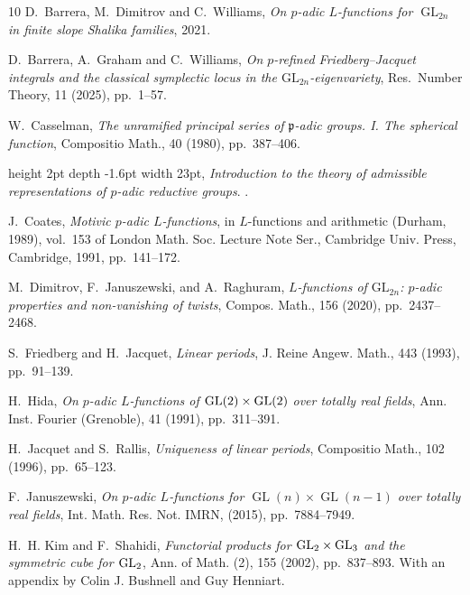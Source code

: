 \documentclass{amsart}
\theoremstyle{definition}
\begin{document}
{\begin{thebibliography}{10}
{\sc D.~Barrera, M.~Dimitrov and C.~Williams}, {\em On $p$-adic
  $L$-functions for $\operatorname{GL}_{2n}$ in finite slope Shalika families}, 2021.

{\sc D.~Barrera, A.~Graham and C.~Williams}, {\em On $p$-refined
  {F}riedberg--{J}acquet integrals and the classical symplectic locus in the
  {$\mathrm{GL}_{2n}$}-eigenvariety}, Res.\ Number Theory, 11 (2025),
  pp.~1--57.


{\sc W.~Casselman}, {\em The unramified principal series of
  {$\mathfrak{p}$}-adic groups. {I}. {T}he spherical function}, Compositio
  Math., 40 (1980), pp.~387--406.

\leavevmode\vrule height 2pt depth -1.6pt width 23pt, {\em Introduction to the
  theory of admissible representations of $p$-adic reductive groups}.
.

{\sc J.~Coates}, {\em Motivic {$p$}-adic {$L$}-functions}, in {$L$}-functions
  and arithmetic ({D}urham, 1989), vol.~153 of London Math. Soc. Lecture Note
  Ser., Cambridge Univ. Press, Cambridge, 1991, pp.~141--172.

{\sc M.~Dimitrov, F.~Januszewski, and A.~Raghuram}, {\em {$L$}-functions of
  {$\mathrm{GL}_{2n}$}: {$p$}-adic properties and non-vanishing of twists},
  Compos. Math., 156 (2020), pp.~2437--2468.

{\sc S.~Friedberg and H.~Jacquet}, {\em Linear periods}, J. Reine Angew. Math.,
  443 (1993), pp.~91--139.

{\sc H.~Hida}, {\em On {$p$}-adic {$L$}-functions of {${\rm GL}(2)\times {\rm
  GL}(2)$} over totally real fields}, Ann. Inst. Fourier (Grenoble), 41 (1991),
  pp.~311--391.

{\sc H.~Jacquet and S.~Rallis}, {\em Uniqueness of linear periods}, Compositio
  Math., 102 (1996), pp.~65--123.

{\sc F.~Januszewski}, {\em On {$p$}-adic {$L$}-functions for
  {$\operatorname{GL}(n)\times\operatorname{GL}(n-1)$} over totally real
  fields}, Int. Math. Res. Not. IMRN,  (2015), pp.~7884--7949.

{\sc H.~H. Kim and F.~Shahidi}, {\em Functorial products for {${\rm
  GL}_2\times{\rm GL}_3$} and the symmetric cube for {${\rm GL}_2$}}, Ann. of
  Math. (2), 155 (2002), pp.~837--893.
\newblock With an appendix by Colin J. Bushnell and Guy Henniart.


\end{thebibliography}}
\end{document}

